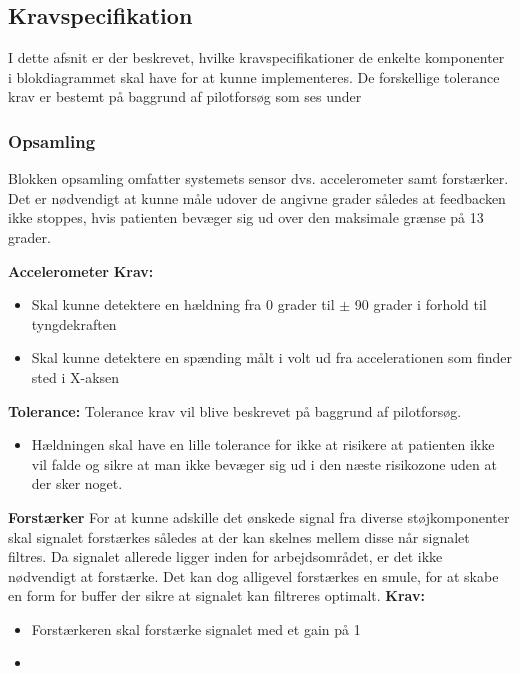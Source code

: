 \subsection{Kravspecifikation}
I dette afsnit er der beskrevet, hvilke kravspecifikationer de enkelte komponenter i blokdiagrammet skal have for at kunne implementeres. De forskellige tolerance krav er bestemt på baggrund af pilotforsøg som ses under 

\subsubsection{Opsamling}
Blokken opsamling omfatter systemets sensor dvs. accelerometer samt forstærker. Det er nødvendigt at kunne måle udover de angivne grader således at feedbacken ikke stoppes, hvis patienten bevæger sig ud over den maksimale grænse på 13 grader.

\textbf{Accelerometer}
\textbf{Krav:}
\begin{itemize}
\item Skal kunne detektere en hældning fra 0 grader til $\pm$ 90 grader i forhold til tyngdekraften
\item Skal kunne detektere en spænding målt i volt ud fra accelerationen som finder sted i X-aksen
\end{itemize}

\textbf{Tolerance:}
Tolerance krav vil blive beskrevet på baggrund af pilotforsøg.
\begin{itemize}
\item Hældningen skal have en lille tolerance for ikke at risikere at patienten ikke vil falde og sikre at man ikke bevæger sig ud i den næste risikozone uden at der sker noget.
\end{itemize}

\textbf{Forstærker}
For at kunne adskille det ønskede signal fra diverse støjkomponenter skal signalet forstærkes således at der kan skelnes mellem disse når signalet filtres. Da signalet allerede ligger inden for arbejdsområdet, er det ikke nødvendigt at forstærke. Det kan dog alligevel forstærkes en smule, for at skabe en form for buffer der sikre at signalet kan filtreres optimalt. 
\textbf{Krav:}
\begin{itemize}
\item Forstærkeren skal forstærke signalet med et gain på 1
\item 
\end{itemize}

